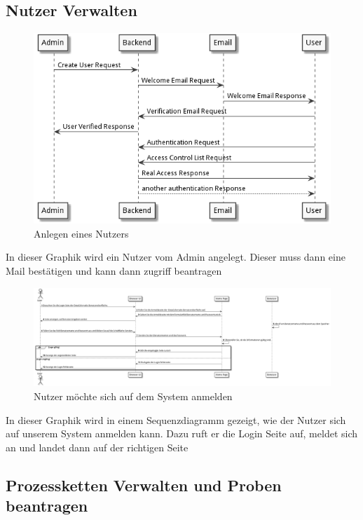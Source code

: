 \documentclass[enabledeprecatedfontcommands,fontsize=12pt,paper=a4,twoside]{scrartcl}
\begin{document}
\subsection{Nutzer Verwalten}
\begin{figure}[H]
  \includegraphics[width=\linewidth]{UML/seq.png}
  \caption{Anlegen eines Nutzers}
  \label{fig:pkErstellen}
\end{figure}
In dieser Graphik wird ein Nutzer vom Admin angelegt. Dieser muss dann eine Mail bestätigen und kann dann zugriff beantragen


\begin{figure}[H]
  \includegraphics[width=\linewidth]{UML/erstbenutzung.png}
  \caption{Nutzer möchte sich auf dem System anmelden}
  \label{fig:pkErstellen}
\end{figure}
In dieser Graphik wird in einem Sequenzdiagramm gezeigt, wie der Nutzer sich auf unserem System anmelden kann. Dazu ruft er die Login Seite auf, meldet sich an und landet dann auf der richtigen Seite

\subsection{Prozessketten Verwalten und Proben beantragen}
\end{document}
